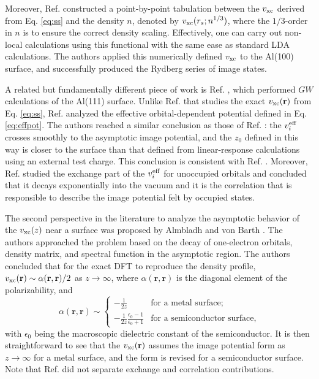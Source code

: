 \documentclass[aip, amsmath, amssymb, reprint, longbibliography]{revtex4-2}
\def\mr{\mathbf{r}}
\begin{document}
Moreover, Ref.  constructed a point-by-point tabulation between the $v_{\rm xc}$ derived from Eq. \eqref{eq:ss} and the density $n$, denoted by $v_{\rm xc}(r_s;n^{1/3})$, where the $1/3$-order in $n$ is to ensure the correct density scaling. Effectively, one can carry out non-local calculations using this functional with the same ease as standard LDA calculations. The authors applied this numerically defined $v_{\rm xc}$ to the Al(100) surface, and successfully produced the Rydberg series of image states.

A related but fundamentally different piece of work is Ref. , which performed $GW$ calculations of the Al(111) surface. Unlike Ref.  that studies the exact $v_{\rm xc}(\mr)$ from Eq. \eqref{eq:ss}, Ref.  analyzed the effective orbital-dependent potential defined in Eq. \eqref{eq:effpot}. The authors reached a similar conclusion as those of Ref. : the $v_{i}^{\rm eff}$ crosses smoothly to the asymptotic image potential, and the $z_0$ defined in this way is closer to the surface than that defined from linear-response calculations using an external test charge\cite{LK73, LN93, SSG88}. This conclusion is consistent with Ref. . Moreover, Ref.  studied the exchange part of the $v_{i}^{\rm eff}$ for unoccupied orbitals and concluded that it decays exponentially into the vacuum and it is the correlation that is responsible to describe the image potential felt by occupied states.

The second perspective in the literature to analyze the asymptotic behavior of the $v_{\rm xc}(z)$ near a surface was proposed by Almbladh and von Barth \cite{AB85}. The authors approached the problem based on the decay of one-electron orbitals, density matrix, and spectral function in the asymptotic region. The authors concluded that for the exact DFT to reproduce the density profile, $v_{\rm xc}(\mr) \sim \alpha(\mr,\mr)/2$ as $z\to\infty$, where $\alpha(\mr,\mr)$ is the diagonal element of the polarizability, and
\begin{equation}
\alpha(\mr,\mr)\sim\begin{cases}
-\frac{1}{2z} & \mbox{for a metal surface;} \\
-\frac{1}{2z}\frac{\epsilon_0-1}{\epsilon_0+1} & \mbox{for a semiconductor surface,}
\end{cases}
\label{eq:ab85}
\end{equation}
with $\epsilon_0$ being the macroscopic dielectric constant of the semiconductor. It is then straightforward to see that the $v_{\rm xc}(\mr)$ assumes the image potential form as $z\to\infty$ for a metal surface, and the form is revised for a semiconductor surface. Note that Ref.  did not separate exchange and correlation contributions.
\end{document}
